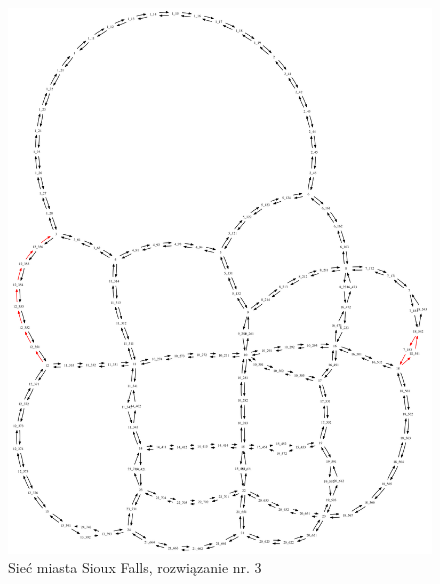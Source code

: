 \documentclass[twoside,12pt]{report}
\begin{document}
\begin{figure}[ht]
\centering
\includegraphics[totalheight=0.580\textheight, angle=90]{img/sioux-out/3/network2}
\caption{Sieć miasta Sioux Falls, rozwiązanie nr. 3}
\label{sioux3}
\end{figure}
\end{document}
